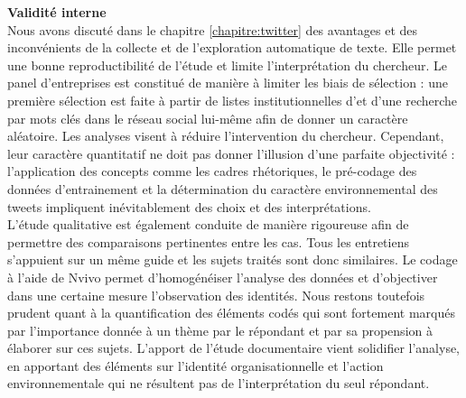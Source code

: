         \textbf{Validité interne} \\
        Nous avons discuté dans le chapitre \ref{chapitre:twitter} des avantages et des inconvénients de la collecte et de l'exploration automatique de texte. Elle permet une bonne reproductibilité de l'étude et limite l'interprétation du chercheur. Le panel d'entreprises est constitué de manière à limiter les biais de sélection : une première sélection est faite à partir de listes institutionnelles d'\eess et d'une recherche par mots clés dans le réseau social lui-même afin de donner un caractère aléatoire. Les analyses visent à réduire l'intervention du chercheur. Cependant, leur caractère quantitatif ne doit pas donner l'illusion d'une parfaite objectivité : l'application des concepts comme les cadres rhétoriques, le pré-codage des données d'entrainement et la détermination du caractère environnemental des tweets impliquent inévitablement des choix et des interprétations. \\

        L'étude qualitative est également conduite de manière rigoureuse afin de permettre des comparaisons pertinentes entre les cas. Tous les entretiens s'appuient sur un même guide et les sujets traités sont donc similaires. Le codage à l'aide de Nvivo permet d'homogénéiser l'analyse des données et d'objectiver dans une certaine mesure l'observation des identités. Nous restons toutefois prudent quant à la quantification des éléments codés qui sont fortement marqués par l'importance donnée à un thème par le répondant et par sa propension à élaborer sur ces sujets. L'apport de l'étude documentaire vient solidifier l'analyse, en apportant des éléments sur l'identité organisationnelle et l'action environnementale qui ne résultent pas de l'interprétation du seul répondant. \\

